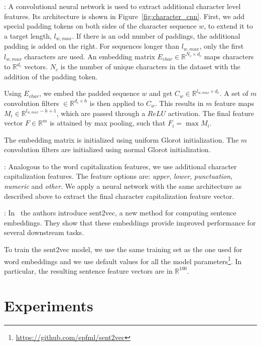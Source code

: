 \documentclass[11pt,letterpaper]{article}
\begin{document}
: A convolutional neural network
is used to extract additional character level features. Its architecture is
shown in Figure~\ref{fig:character_cnn}. First, we add special padding tokens
on both sides of the character sequence $w$, to extend it to a target length,
$l_{w, max}$. If there is an odd number of paddings, the additional padding is
added on the right. For sequences longer than $l_{w, max}$, only the first
$l_{w, max}$ characters are used. An embedding matrix $E_{char} \in \mathbb{R}^{N_{c} \times d_c}$
maps characters to $\mathbb{R}^{d_c}$ vectors. $N_{c}$ is the number of unique
characters in the dataset with the addition of the padding token.

Using $E_{char}$, we embed the padded sequence $w$ and get $C_{w} \in \mathbb{R}^{l_{w, max} \times d_{c}}$.
A set of $m$ convolution filters $\in \mathbb{R}^{d_c \times h}$ is then applied to $C_{w}$.
This results in $m$ feature maps $M_i \in \mathbb{R}^{l_{w, max} - h + 1}$, which
are passed through a $ReLU$ activation. The final feature vector $F \in \mathbb{R}^{m}$
is attained by max pooling, such that $F_i = \max M_i$.

The embedding matrix is initialized using uniform Glorot initialization.
The $m$ convolution filters are initialized using normal Glorot initialization.

: Analogous to the
word capitalization features, we use additional character capitalization features.
The feature options are: \textit{upper}, \textit{lower}, \textit{punctuation}, \textit{numeric} and \textit{other}.
We apply a neural network with the same architecture as described above to extract the
final character capitalization feature vector.

: In~\cite{sent2vec} the authors introduce sent2vec,
a new method for computing sentence embeddings. They show that these embeddings
provide improved performance for several downstream tasks.

To train the sent2vec model, we use the same training set as the one used for word embeddings and we use
default values for all the model parameters\footnote{\url{https://github.com/epfml/sent2vec}}.
In particular, the resulting sentence feature vectors are in $\mathbb{R}^{100}$.

\section{Experiments}
\label{sec:experiments}
\end{document}
